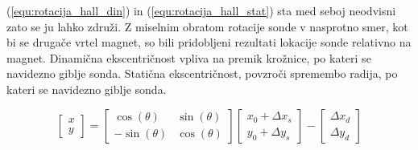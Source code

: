 (\ref{equ:rotacija_hall_din}) in (\ref{equ:rotacija_hall_stat}) sta med seboj neodvisni zato se ju lahko združi. 
Z miselnim obratom rotacije sonde v nasprotno smer, kot bi se drugače vrtel magnet, so bili pridobljeni rezultati lokacije sonde relativno na magnet.
Dinamična ekscentričnost vpliva na premik krožnice, po kateri se navidezno giblje sonda. Statična ekscentričnost, povzroči spremembo radija, po kateri se navidezno giblje sonda.

\begin{equation}
\label{equ:rotacija_hall_koncna}
\begin{bmatrix} x\\y \end{bmatrix}=
\begin{bmatrix} \cos(\theta)&\sin(\theta)\\-\sin(\theta)&\cos(\theta) \end{bmatrix}
\begin{bmatrix} x_0+\Delta x_s\\y_0+\Delta y_s \end{bmatrix}-
\begin{bmatrix} \Delta x_d\\\Delta y_d \end{bmatrix}
\end{equation}








